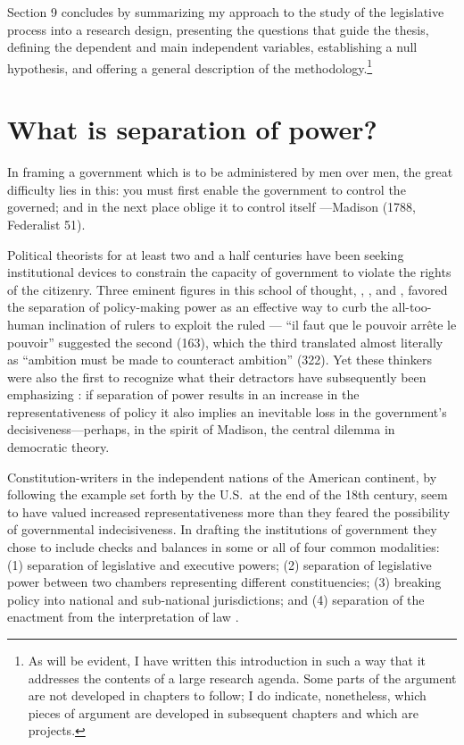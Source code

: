 Section 9 concludes by summarizing my approach to the study of the legislative process into a research design, presenting the questions that guide the thesis, defining the dependent and main independent variables, establishing a null hypothesis, and offering a general description of the methodology.\footnote{As will be evident, I have written this introduction in such a way that it addresses the contents of a large research agenda.  Some parts of the argument are not developed in chapters to follow; I do indicate, nonetheless, which pieces of argument are developed in subsequent chapters and which are projects.}

\section{What is separation of power?}
\label{s:whatSOP}

In framing a government which is to be administered by men over men, 
the great difficulty lies in this: you must first enable the government to 
control the governed; and in the next place oblige it to control itself
—Madison (1788, Federalist 51). \nocite{madison.1788}

Political theorists for at least two and a half centuries have been seeking institutional devices to constrain the capacity of government to violate the rights of the citizenry.  Three eminent figures in this school of thought, \citet{locke.1690}, \citet{montesquieu.1748}, and \citet{madison.1788}, favored the separation of policy-making power as an effective way to curb the all-too-human inclination of rulers to exploit the ruled --- ``il faut que le pouvoir arr\^ete le pouvoir'' suggested the second (163), which the third translated almost literally as ``ambition must be made to counteract ambition'' (322).  Yet these thinkers were also the first to recognize what their detractors have subsequently been emphasizing \citep[eg.][]{bagehot.1867,wilson.1884,romero.1893}: if separation of power results in an increase in the representativeness of policy it also implies an inevitable loss in the government's decisiveness---perhaps, in the spirit of Madison, the central dilemma in democratic theory.  

Constitution-writers in the independent nations of the American continent, by following the example set forth by the U.S.\ at the end of the 18th century, seem to have valued increased representativeness more than they feared the possibility of governmental indecisiveness.  In drafting the institutions of government they chose to include checks and balances in some or all of four common modalities: (1) separation of legislative and executive powers; (2) separation of legislative power between two chambers representing different constituencies; (3) breaking policy into national and sub-national jurisdictions; and (4) separation of the enactment from the interpretation of law \citep[see][]{cox.mccubbins.2001,tsebelis.1995}. 

